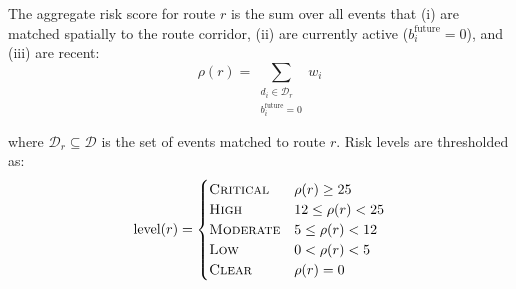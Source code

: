 The aggregate risk score for route $r$ is the sum over all events
that (i) are matched spatially to the route corridor, (ii) are
currently active ($b_i^{\text{future}} = 0$), and (iii) are recent:
\begin{equation}
  \rho(r) = \sum_{\substack{d_i \in \mathcal{D}_r \\ b_i^{\text{future}}=0}}
            w_i
  \label{eq:route_risk}
\end{equation}

where $\mathcal{D}_r \subseteq \mathcal{D}$ is the set of events
matched to route $r$. Risk levels are thresholded as:
\begin{equation}
  \text{level}(r) =
  \begin{cases}
    \textsc{Critical} & \rho(r) \geq 25 \\
    \textsc{High}     & 12 \leq \rho(r) < 25 \\
    \textsc{Moderate} & 5  \leq \rho(r) < 12 \\
    \textsc{Low}      & 0  < \rho(r) < 5 \\
    \textsc{Clear}    & \rho(r) = 0
  \end{cases}
  \label{eq:risk_levels}
\end{equation}
